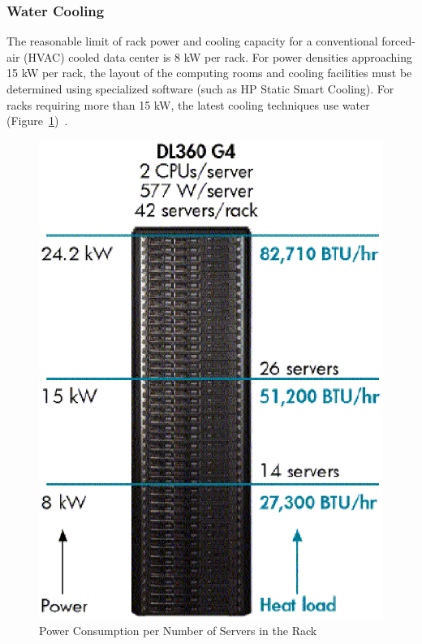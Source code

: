 {            \subsubsection*{Water Cooling}
                The reasonable limit of rack power and cooling capacity for a conventional forced-air (HVAC) cooled data center is 8 kW per rack. For power densities approaching 15 kW per rack, the layout of the computing rooms and cooling facilities must be determined using specialized software (such as HP Static Smart Cooling). For racks requiring more than 15 kW, the latest cooling techniques use water (Figure~\ref{fig:power_consumption_number_servers_rack})~\cite{HPCooling07}.
                \begin{figure}[h!tb]
                    \centering
                    \includegraphics[scale=0.5]{graphics/power_consumption_number_servers_rack}
                    \caption{Power Consumption per Number of Servers in the Rack}
                    \label{fig:power_consumption_number_servers_rack}
                \end{figure}
                
}
